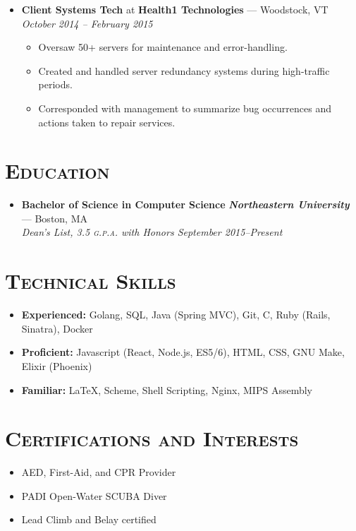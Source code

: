 \documentclass{article}
\begin{document}
\begin{itemize}[label={},leftmargin=*]
\item \textbf{Client Systems Tech} at \textbf{Health1 Technologies} --- Woodstock, VT \hfill {\em October 2014 -- February 2015}
  \begin{itemize}[label={$\bullet$}]
  \item Oversaw 50+ servers for maintenance and error-handling.
  \item Created and handled server redundancy systems during high-traffic periods.
  \item Corresponded with management to summarize bug occurrences and actions taken to repair services.
  \end{itemize}

\end{itemize}

\section*{\textsc{Education}}
\begin{itemize}[label={},leftmargin=*]
\item \textbf{Bachelor of Science in Computer Science} \hfill \textit{\textbf{Northeastern University}} --- Boston, MA \\ \em{Dean's List}, 3.5 \textsc{g.p.a.} with Honors \hfill {\em September 2015--Present}
\end{itemize}

\section*{\textsc{Technical Skills}}
\begin{itemize}[label={},leftmargin=*]
\item \textbf{Experienced:} Golang, SQL, Java (Spring MVC), Git, C, Ruby (Rails, Sinatra), Docker
\item \textbf{Proficient:} Javascript (React, Node.js, ES5/6), HTML, CSS, GNU Make, Elixir (Phoenix)
\item \textbf{Familiar:} LaTeX, Scheme, Shell Scripting, Nginx, MIPS Assembly
\end{itemize}


\section*{\textsc{Certifications and Interests}}
\begin{multicols}{2}
  \begin{itemize}[label={$\bullet$}]
  \item AED, First-Aid, and CPR Provider
  \item PADI Open-Water SCUBA Diver
  \item Lead Climb and Belay certified
  \end{itemize}
\end{multicols}
\end{document}
